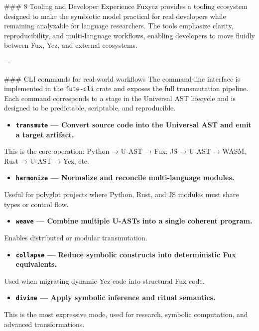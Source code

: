 \begin{enumerate}
    
    \#\#\# 8 Tooling and Developer Experience  
Fuxyez provides a tooling ecosystem designed to make the symbiotic model practical for real developers while remaining analyzable for language researchers. The tools emphasize clarity, reproducibility, and multi‑language workflows, enabling developers to move fluidly between Fux, Yez, and external ecosystems.

---

\#\#\# CLI commands for real-world workflows  
The command-line interface is implemented in the \texttt{fute-cli} crate and exposes the full transmutation pipeline. Each command corresponds to a stage in the Universal AST lifecycle and is designed to be predictable, scriptable, and reproducible.

\begin{itemize}
  \item \textbf{\texttt{transmute} — Convert source code into the Universal AST and emit a target artifact.}  
\end{itemize}
  This is the core operation: Python → U‑AST → Fux, JS → U‑AST → WASM, Rust → U‑AST → Yez, etc.

\begin{itemize}
  \item \textbf{\texttt{harmonize} — Normalize and reconcile multi-language modules.}  
\end{itemize}
  Useful for polyglot projects where Python, Rust, and JS modules must share types or control flow.

\begin{itemize}
  \item \textbf{\texttt{weave} — Combine multiple U‑ASTs into a single coherent program.}  
\end{itemize}
  Enables distributed or modular transmutation.

\begin{itemize}
  \item \textbf{\texttt{collapse} — Reduce symbolic constructs into deterministic Fux equivalents.}  
\end{itemize}
  Used when migrating dynamic Yez code into structural Fux code.

\begin{itemize}
  \item \textbf{\texttt{divine} — Apply symbolic inference and ritual semantics.}  
\end{itemize}
  This is the most expressive mode, used for research, symbolic computation, and advanced transformations.


\end{enumerate}
